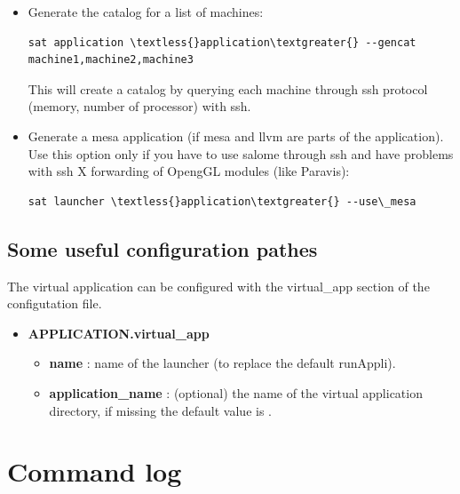 \documentclass[a4paper,10pt,english]{sphinxmanual}
\begin{document}
\begin{itemize}
\item {} 
Generate the catalog for a list of machines:

\begin{Verbatim}[commandchars=\\\{\}]
sat application \textless{}application\textgreater{} --gencat machine1,machine2,machine3
\end{Verbatim}

This will create a catalog by querying each machine through ssh protocol (memory, number of processor) with ssh.

\item {} 
Generate a mesa application (if mesa and llvm are parts of the application). Use this option only if you have to use salome through ssh and have problems with ssh X forwarding of OpengGL modules (like Paravis):

\begin{Verbatim}[commandchars=\\\{\}]
sat launcher \textless{}application\textgreater{} --use\_mesa
\end{Verbatim}

\end{itemize}


\subsection{Some useful configuration pathes}
\label{commands/application:some-useful-configuration-pathes}
The virtual application can be configured with the virtual\_app section of the configutation file.
\begin{itemize}
\item {} 
\textbf{APPLICATION.virtual\_app}
\begin{itemize}
\item {} 
\textbf{name} : name of the launcher (to replace the default runAppli).

\item {} 
\textbf{application\_name} : (optional) the name of the virtual application directory, if missing the default value is .

\end{itemize}

\end{itemize}
\clearpage

\section{Command log}
\label{commands/log:svn}\label{commands/log:command-log}\label{commands/log::doc}
\end{document}

